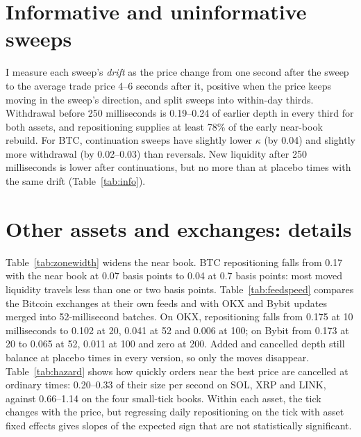 \documentclass[12pt]{article}
\newcommand{\tabnote}[1]{\par\vspace{2pt}{\footnotesize\singlespacing\noindent #1\par}\vspace{6pt}}
\begin{document}
\section{Informative and uninformative sweeps}
\label{sec:info}

I measure each sweep's \emph{drift} as the price change from one second after the sweep to the
average trade price 4--6 seconds after it, positive when the price keeps moving in the sweep's
direction, and split sweeps into within-day thirds. Withdrawal before 250 milliseconds is
0.19--0.24 of earlier depth in every third for both assets, and repositioning supplies at least
78\% of the early near-book rebuild. For BTC, continuation sweeps have slightly lower $\kappa$
(by 0.04) and slightly more withdrawal (by 0.02--0.03) than reversals. New liquidity after 250
milliseconds is lower after continuations, but no more than at placebo times with the same drift
(Table~\ref{tab:info}).

\begin{table}[ht]
\centering
\caption{Continuation versus reversal sweeps}
\tabnote{Continuation minus reversal sweeps (within-day thirds of drift), with 95\% paired
day-cluster bootstrap intervals. Placebo times re-matched per third from all placebo times, or
from placebo times with similar drift.}
\label{tab:info}
\resizebox{\textwidth}{!}{}
\end{table}

\section{Other assets and exchanges: details}
\label{sec:extra}

Table~\ref{tab:zonewidth} widens the near book. BTC repositioning falls from 0.17 with the near
book at 0.07 basis points to 0.04 at 0.7 basis points: most moved liquidity travels less than one
or two basis points. Table~\ref{tab:feedspeed} compares the Bitcoin exchanges at their own feeds
and with OKX and Bybit updates merged into 52-millisecond batches. On OKX, repositioning falls from
0.175 at 10 milliseconds to 0.102 at 20, 0.041 at 52 and 0.006 at 100; on Bybit from 0.173 at 20
to 0.065 at 52, 0.011 at 100 and zero at 200. Added and cancelled depth still balance at placebo
times in every version, so only the moves disappear. Table~\ref{tab:hazard} shows how quickly
orders near the best price are cancelled at ordinary times: 0.20--0.33 of their size per second on
SOL, XRP and LINK, against 0.66--1.14 on the four small-tick books. Within each asset, the tick
changes with the price, but regressing daily repositioning on the tick with asset fixed effects
gives slopes of the expected sign that are not statistically significant.
\end{document}
